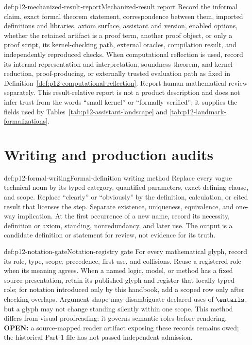 \begin{hbmethod}{def:p12-mechanized-result-report}{Mechanized-result report}
Record the informal claim, exact formal theorem statement, correspondence
between them, imported definitions and libraries, axiom surface, assistant and
version, enabled options, whether the retained artifact is a proof term,
another proof object, or only a proof script, its kernel-checking path, external
oracles, compilation result, and independently reproduced checks.  When
computational reflection is used, record its internal representation and
interpretation, soundness theorem, and kernel-reduction, proof-producing, or
externally trusted evaluation path as fixed in
Definition~\ref{def:p12-computational-reflection}.  Report human mathematical
review separately.  This result-relative report is not a
product description and does not infer trust from the words “small kernel” or
“formally verified”; it supplies the fields used by
Tables~\ref{tab:p12-assistant-landscape} and
\ref{tab:p12-landmark-formalizations}.
\end{hbmethod}

\section{Writing and production audits}

\begin{hbmethod}{def:p12-formal-writing}{Formal-definition writing method}
Replace every vague technical noun by its typed category, quantified
parameters, exact defining clause, and scope.  Replace “clearly” or “obviously”
by the definition, calculation, or cited result that licenses the step.
Separate existence, uniqueness, equivalence, and one-way implication.  At the
first occurrence of a new name, record its necessity, definition or axiom,
standing, nonredundancy, and later use.  The output is a candidate definition
or statement for review, not evidence for its truth.
\end{hbmethod}

\begin{hbmethod}{def:p12-notation-gate}{Notation-registry gate}
For every mathematical glyph, record its role, type, scope, precedence, first
use, and collisions.  Reuse a registered role when its
meaning agrees.  When a named logic, model, or method has a fixed source
presentation, retain its published glyph and register that locally typed role;
for notation introduced only by this handbook, add a scoped row only after
checking overlaps.  Argument shape may disambiguate declared uses
of \(\entails\), but a glyph may not change standing silently within one scope.
This method differs from visual proofreading: it governs semantic roles before
rendering.  \textbf{OPEN:} a source-mapped reader artifact exposing these
records remains owed; the historical Part-1 file has not passed independent
admission.
\end{hbmethod}

